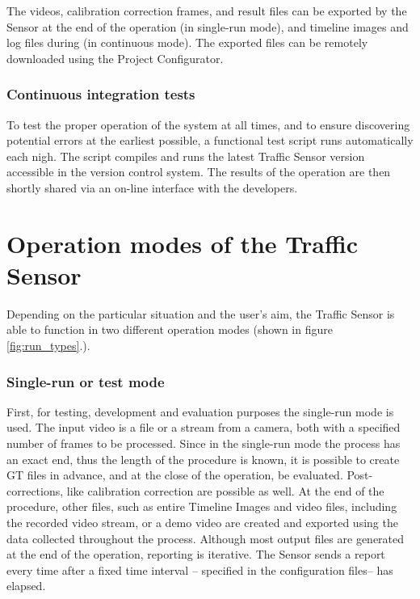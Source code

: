 The videos, calibration correction frames, and result files can be exported by the Sensor at the end of the operation (in single-run mode), and timeline images and log files during (in continuous mode).
The exported files can be remotely downloaded using the Project Configurator.

\subsubsection{Continuous integration tests}
To test the proper operation of the system at all times, and to ensure discovering potential errors at the earliest possible, a functional test script runs automatically each nigh.
The script compiles and runs the latest Traffic Sensor version accessible in the version control system.
The results of the operation are then shortly shared via an on-line interface with the developers.
\section{Operation modes of the Traffic Sensor}\label{chap:operation_modes}
Depending on the particular situation and the user's aim, the Traffic Sensor is able to function in two different operation modes (shown in figure \ref{fig:run_types}.).
\subsubsection{Single-run or test mode}\label{sec:run_modes}
First, for testing, development and evaluation purposes the single-run mode is used.
The input video is a file or a stream from a camera, both with a specified number of frames to be processed.
Since in the single-run mode the process has an exact end, thus the length of the procedure is known, it is possible to create GT files in advance, and at the close of the operation, be evaluated.
Post-corrections, like calibration correction are possible as well.
At the end of the procedure, other files, such as entire Timeline Images and video files, including the recorded video stream, or a demo video are created and exported using the data collected throughout the process.
Although most output files are generated at the end of the operation, reporting is iterative.
The Sensor sends a report every time after a fixed time interval -- specified in the configuration files-- has elapsed.

